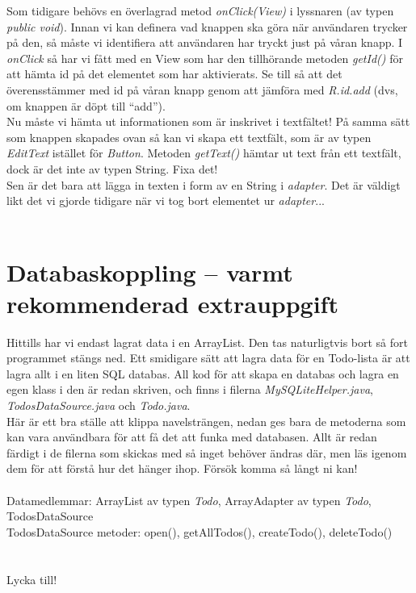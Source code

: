 \documentclass[11 pt, titlepage]{article} %
\begin{document}
Som tidigare behövs en överlagrad metod \textit{onClick(View)} i lyssnaren (av typen \textit{public void}). Innan vi kan definera vad knappen ska göra när användaren trycker på den, så måste vi identifiera att användaren har tryckt just på våran knapp.
I \textit{onClick} så har vi fått med en View som har den tillhörande metoden \textit{getId()} för att hämta id på det elementet som har aktivierats.
Se till så att det överensstämmer med id på våran knapp genom att jämföra med \textit{R.id.add} (dvs, om knappen är döpt till ``add'').\\

Nu måste vi hämta ut informationen som är inskrivet i textfältet! På samma sätt som knappen skapades ovan så kan vi skapa ett textfält, som är av typen \textit{EditText} istället för \textit{Button}.
Metoden \textit{getText()} hämtar ut text från ett textfält, dock är det inte av typen String. Fixa det!\\

Sen är det bara att lägga in texten i form av en String i \textit{adapter}. Det är väldigt likt det vi gjorde tidigare när vi tog bort elementet ur \textit{adapter}...\\ \\
\section{Databaskoppling – varmt rekommenderad extrauppgift}
Hittills har vi endast lagrat data i en ArrayList.
Den tas naturligtvis bort så fort programmet stängs ned.
Ett smidigare sätt att lagra data för en Todo-lista är att lagra allt i en liten SQL databas.
All kod för att skapa en databas och lagra en egen klass i den är redan skriven, och finns i filerna \textit{MySQLiteHelper.java}, \textit{TodosDataSource.java} och \textit{Todo.java}.\\

Här är ett bra ställe att klippa navelsträngen, nedan ges bara de metoderna som kan vara användbara för att få det att funka med databasen.
Allt är redan färdigt i de filerna som skickas med så inget behöver ändras där, men läs igenom dem för att förstå hur det hänger ihop.
Försök komma så långt ni kan!\\ \\

Datamedlemmar: ArrayList av typen \textit{Todo}, ArrayAdapter av typen \textit{Todo}, TodosDataSource \\
TodosDataSource metoder: open(), getAllTodos(), createTodo(), deleteTodo() \\

\\ \\

Lycka till!
\end{document}
